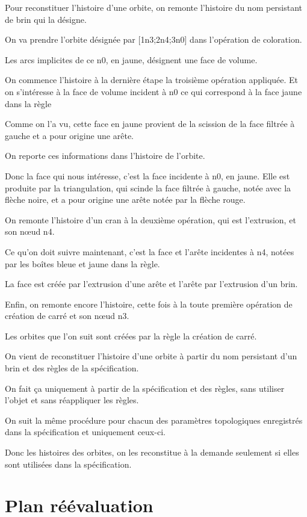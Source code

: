 \documentclass[11pt]{article}
\begin{document}
Pour reconstituer l'histoire d'une orbite, on remonte l'histoire du nom
persistant de brin qui la désigne.

On va prendre l'orbite désignée par [1n3;2n4;3n0] dans l'opération de
coloration.

Les arcs implicites de ce n0, en jaune, désignent une face de volume.

On commence l'histoire à la dernière étape la troisième opération appliquée. Et
on s'intéresse à la face de volume incident à n0 ce qui correspond à la face
jaune dans la règle

Comme on l'a vu, cette face en jaune provient de la scission de la face filtrée
à gauche et a pour origine une arête.

On reporte ces informations dans l'histoire de l'orbite.

Donc la face qui nous intéresse, c'est la face incidente à n0, en jaune. Elle
est produite par la triangulation, qui scinde la face filtrée à gauche, notée
avec la flèche noire, et a pour origine une arête notée par la flèche rouge.

On remonte l'histoire d'un cran à la deuxième opération, qui est l'extrusion, et
son nœud n4.

Ce qu'on doit suivre maintenant, c'est la face et l'arête incidentes à n4,
notées par les boîtes bleue et jaune dans la règle.

La face est créée par l'extrusion d'une arête et l'arête par l'extrusion d'un
brin.

Enfin, on remonte encore l'histoire, cette fois à la toute première opération de
création de carré et son nœud n3.

Les orbites que l'on suit sont créées par la règle la création de carré.

On vient de reconstituer l'histoire d'une orbite à partir du nom persistant d'un
brin et des règles de la spécification.

On fait ça uniquement à partir de la spécification et des règles, sans utiliser
l'objet et sans réappliquer les règles.

On suit la même procédure pour chacun des paramètres topologiques enregistrés
dans la spécification et uniquement ceux-ci.

Donc les histoires des orbites, on les reconstitue à la demande seulement si
elles sont utilisées dans la spécification.

\section{Plan réévaluation}
\label{sec:org04c39be}
\end{document}
